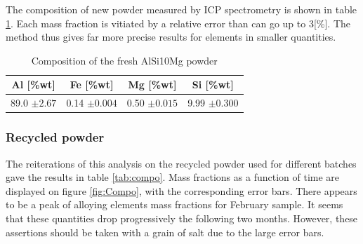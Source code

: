 The composition of new powder measured by ICP spectrometry is shown in table \ref{tab:compoF}. Each mass fraction is vitiated by a relative error than can go up to 3[\%]. The method thus gives far more precise results for elements in smaller quantities.\\
 \begin{center}
\begin{table}[ht]
\centering
\begin{tabular}{|c|c |c |c| }
    \hline
    Al [\%wt]& Fe [\%wt]&Mg [\%wt]&Si [\%wt]\\
\hline 
\hline   
    89.0 $\pm 2.67$&0.14 $\pm 0.004$& 0.50 $\pm 0.015$ &9.99 $\pm 0.300$\\
    \hline
\end{tabular}

\caption[Composition of the fresh AlSi10Mg powder]{Composition of the fresh AlSi10Mg powder}
\label{tab:compoF}
\end{table}
 \end{center}


\subsubsection{Recycled powder}

The reiterations of this analysis on the recycled powder used for different batches gave the results in table \ref{tab:compo}. Mass fractions as a function of time are displayed on figure \ref{fig:Compo}, with the corresponding error bars. There appears to be a peak of alloying elements mass fractions for February sample. It seems that these quantities drop progressively the following two months. However, these assertions should be taken with a grain of salt due to the large error bars.

